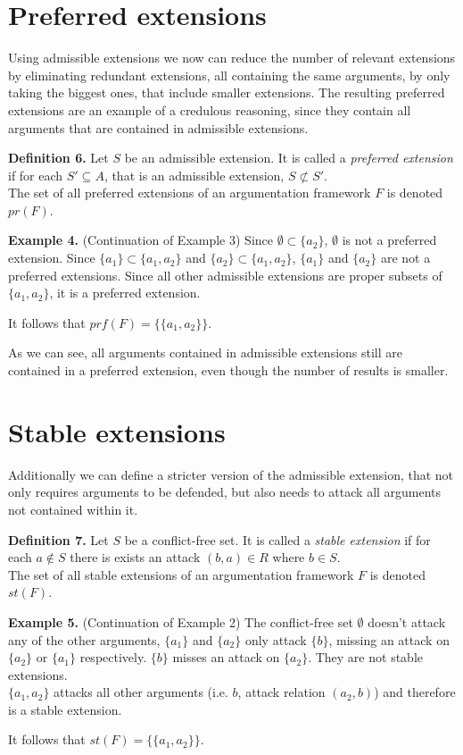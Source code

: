 \documentclass[draft,final]{vutinfth} %
\newcommand{\hl}{\par\vspace{6pt}} %
\newcommand{\cl}{\par\vspace{12pt}} %
\begin{document}
\section{Preferred extensions}

Using admissible extensions we now can reduce the number of relevant extensions by eliminating redundant extensions, all containing the same arguments, by only taking the biggest ones, that include smaller extensions. The resulting preferred extensions are an example of a credulous reasoning, since they contain all arguments that are contained in admissible extensions.\cl

\textbf{Definition 6.} Let $S$ be an admissible extension. It is called a \emph{preferred extension} if for each $S'\subseteq A$, that is an admissible extension, $S\not\subset S'$.\\
The set of all preferred extensions of an argumentation framework $F$ is denoted $pr(F)$.\cl

\textbf{Example 4.} (Continuation of Example 3) Since $\emptyset\subset\{a_2\}$, \(\emptyset\) is not a preferred extension. Since $\{a_1\}\subset\{a_1,a_2\}$ and $\{a_2\}\subset\{a_1,a_2\}$, $\{a_1\}$ and $\{a_2\}$ are not a preferred extensions. Since all other admissible extensions are proper subsets of $\{a_1,a_2\}$, it is a preferred extension.\hl
It follows that $prf(F)=\{\{a_1,a_2\}\}$.\hl
As we can see, all arguments contained in admissible extensions still are contained in a preferred extension, even though the number of results is smaller.\cl

\section{Stable extensions}

Additionally we can define a stricter version of the admissible extension, that not only requires arguments to be defended, but also needs to attack all arguments not contained within it.\cl

\textbf{Definition 7.} Let $S$ be a conflict-free set. It is called a \emph{stable extension} if for each $a\not\in S$ there is exists an attack $(b,a)\in R$ where $b\in S$.\\
The set of all stable extensions of an argumentation framework $F$ is denoted $st(F)$.\cl

\textbf{Example 5.} (Continuation of Example 2) The conflict-free set $\emptyset$ doesn't attack any of the other arguments, $\{a_1\}$ and $\{a_2\}$ only attack $\{b\}$, missing an attack on $\{a_2\}$ or $\{a_1\}$ respectively. $\{b\}$ misses an attack on $\{a_2\}$. They are not stable extensions.\\
$\{a_1,a_2\}$ attacks all other arguments (i.e. $b$, attack relation $(a_2,b)$) and therefore is a stable extension.\hl
It follows that $st(F)=\{\{a_1,a_2\}\}$.\cl
\end{document}

